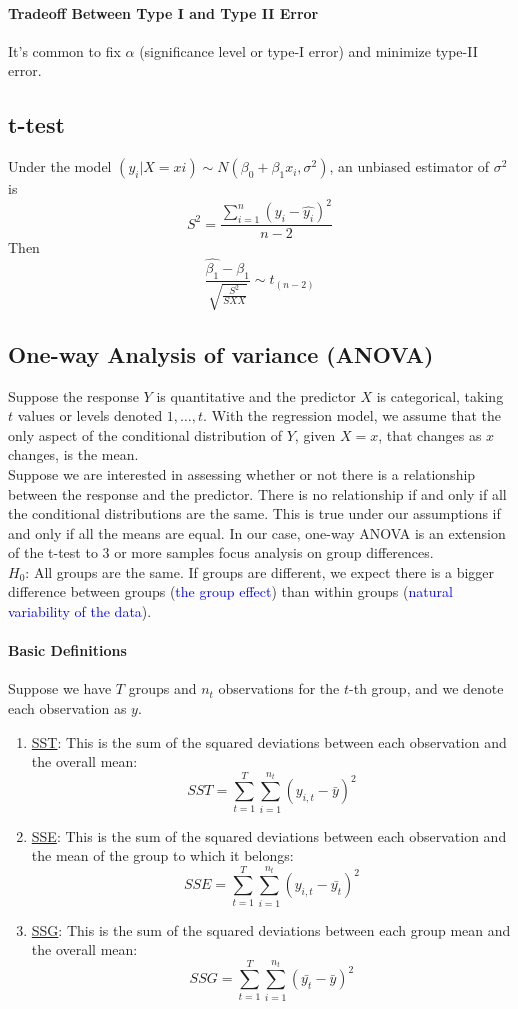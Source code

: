 \documentclass[11pt]{article}
\newcommand{\under}[1]{\underline{#1}}
\begin{document}
\paragraph{Tradeoff Between Type I and Type II Error}
It's common to fix $\alpha$ (significance level or type-I error) and minimize type-II error.
\subsection{t-test}
Under the model $(y_i|X=xi) \sim N(\beta_0 + \beta_1 x_i, \sigma^2)$, an unbiased estimator of $\sigma^2$ is 
$$S^2 = \frac{\sum_{i=1}^n(y_i-\hat{y_i})^2}{n-2} $$
Then
$$ \frac{\hat{\beta_1} - \beta_1}{\sqrt{\frac{S^2}{SXX}}} \sim t_{(n-2)}$$


\subsection{One-way Analysis of variance (ANOVA)}
Suppose the response $Y$ is quantitative and the predictor $X$ is categorical, taking $t$ values or levels denoted $1, \hdots, t$. With the regression model, we assume that the only aspect of the conditional distribution of $Y$, given $X = x$, that changes as $x$ changes, is the mean. \\
Suppose we are interested in assessing whether or not there is a relationship between the response and the predictor. There is no relationship if and only if all the conditional distributions are the same. This is true under our assumptions if and only if all the means are equal.
In our case, one-way ANOVA is an extension of the t-test to 3 or more samples focus analysis on group differences.\\
$H_0$: All groups are the same.
If groups are different, we expect there is a bigger difference between groups (\textcolor{blue}{the group effect}) than within groups (\textcolor{blue}{natural variability of the data}).
\paragraph{Basic Definitions}
Suppose we have $T$ groups and $n_t$ observations for the $t$-th group, and we denote each observation as $y$.
\begin{enumerate}
	\item \under{SST}: This is the sum of the squared deviations between each observation and the overall mean:
	$$SST = \sum_{t=1}^T\sum_{i=1}^{n_t}(y_{i,t}-\bar{y})^2$$
	\item \under{SSE}: This is the sum of the squared deviations between each observation and the mean of the group to which it belongs:
	$$SSE = \sum_{t=1}^T\sum_{i=1}^{n_t}(y_{i,t}-\bar{y_t})^2$$
	\item \under{SSG}: This is the sum of the squared deviations between each group mean and the overall mean:
	$$SSG = \sum_{t=1}^T\sum_{i=1}^{n_t}(\bar{y_t}-\bar{y})^2$$
\end{enumerate}
\end{document}
